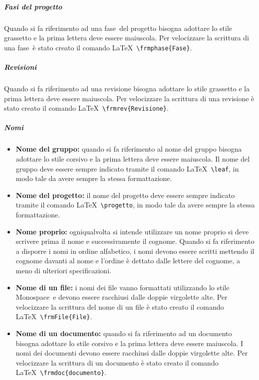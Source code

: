 \documentclass[../NormeProgetto.tex]{subfiles}
\begin{document}
			\subparagraph{Fasi del progetto}
				Quando si fa riferimento ad una fase\g\ del progetto bisogna adottare lo stile grassetto e la prima lettera deve essere maiuscola.	 Per velocizzare la scrittura di una fase\g\ è stato creato il comando \LaTeX\ \texttt{\textbackslash frmphase\{Fase\}}. 
			\subparagraph{Revisioni}
				Quando si fa riferimento ad una revisione bisogna adottare lo stile grassetto e la prima lettera deve essere maiuscola. Per velocizzare la scrittura di una revisione è stato creato il comando \LaTeX\ \texttt{\textbackslash frmrev\{Revisione\}}.
			

			\subparagraph{Nomi}
				\begin{itemize}
					\item \textbf{Nome del gruppo:} quando si fa riferimento al nome del gruppo bisogna adottare lo stile corsivo e la prima lettera deve essere maiuscola.	
					Il nome del gruppo deve essere sempre indicato tramite il comando \LaTeX\ \texttt{\textbackslash leaf}, in modo tale da avere sempre la stessa formattazione.
					\item \textbf{Nome del progetto:} il nome del progetto deve essere sempre indicato tramite il comando \LaTeX\ \texttt{\textbackslash progetto}, in modo tale da avere sempre la stessa formattazione.
					\item \textbf{Nome proprio:} ogniqualvolta si intende utilizzare un nome proprio si deve scrivere prima il nome e successivamente il cognome. Quando si fa riferimento a disporre i nomi in ordine alfabetico, i nomi devono essere scritti mettendo il cognome davanti al nome e l'ordine è dettato dalle lettere del cognome, a meno di ulteriori specificazioni.				
					\item \textbf{Nome di un file:} i nomi dei file vanno formattati utilizzando lo stile Monospace\g\ e devono essere racchiusi dalle doppie virgolette alte.  Per velocizzare la scrittura del nome di un file è stato creato il comando \LaTeX\ \texttt{\textbackslash frmFile\{File\}}.				
					\item \textbf{Nome di un documento:} quando si fa riferimento ad un documento bisogna adottare lo stile corsivo e la prima lettera deve essere maiuscola. I  nomi dei documenti devono essere racchiusi dalle doppie virgolette alte. Per velocizzare la scrittura di un documento è stato creato il comando \LaTeX\ \texttt{\textbackslash frmdoc\{documento\}}.				
				\end{itemize}
\end{document}
